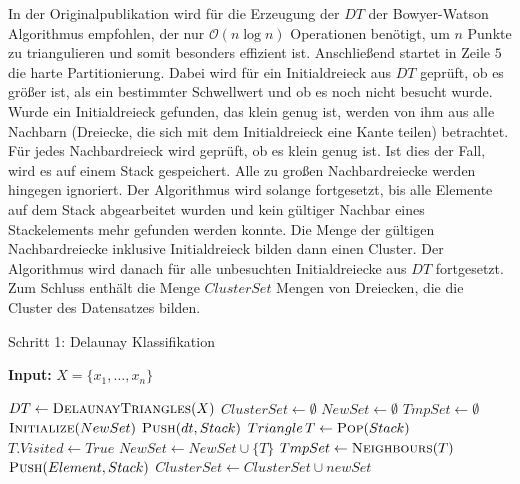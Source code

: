 \documentclass[11pt,ceqn]{book}
\begin{document}
\begin{center}
\begin{minipage}{1\textwidth}
In der Originalpublikation wird für die Erzeugung der $DT$ der Bowyer-Watson Algorithmus empfohlen, der nur $\mathcal{O}(n\log{}n)$ Operationen benötigt, um $n$ Punkte zu triangulieren und somit besonders effizient ist. Anschließend startet in Zeile $5$ die harte Partitionierung. Dabei wird für ein Initialdreieck aus $DT$ geprüft, ob es größer ist, als ein bestimmter Schwellwert und ob es noch nicht besucht wurde. Wurde ein Initialdreieck gefunden, das klein genug ist, werden von ihm aus alle Nachbarn (Dreiecke, die sich mit dem Initialdreieck eine Kante teilen) betrachtet. Für jedes Nachbardreieck wird geprüft, ob es klein genug ist. Ist dies der Fall, wird es auf einem Stack gespeichert. Alle zu großen Nachbardreiecke werden hingegen ignoriert. Der Algorithmus wird solange fortgesetzt, bis alle Elemente auf dem Stack abgearbeitet wurden und kein gültiger Nachbar eines Stackelements mehr gefunden werden konnte. Die Menge der gültigen Nachbardreiecke inklusive Initialdreieck bilden dann einen Cluster. Der Algorithmus wird danach für alle unbesuchten Initialdreiecke aus $DT$ fortgesetzt. Zum Schluss enthält die Menge $ClusterSet$ Mengen von Dreiecken, die die Cluster des Datensatzes bilden.
\end{minipage}
\end{center}





\begin{algorithm}[H]
\caption{ Schritt 1: Delaunay Klassifikation}\label{nsfcdt}
\hspace*{\algorithmicindent} \textbf{Input:} $X=\{x_1,\dots,x_n\}$ 
\begin{algorithmic}[1]
\State $DT \gets \textsc{Delaunay}\textsc{Triangles}(X)$
\State $ClusterSet \gets \emptyset$
\State $NewSet \gets \emptyset$
\State $TmpSet \gets \emptyset$
\State $\textsc{Initialize}(NewSet)$
\State $\textsc{Push}(dt,Stack)$
\State $Triangle\,T \gets \textsc{Pop}(Stack)$
\State $T.Visited \gets True$
\State $NewSet \gets NewSet \cup \{T\}$
\State $TmpSet \gets \textsc{Neighbours}(T)$
\State $\textsc{Push}(Element,Stack)$
\EndIf
\EndFor
\EndIf
\EndWhile
\State $ClusterSet \gets ClusterSet \cup newSet$
\EndIf
\EndFor
\end{algorithmic}
\end{algorithm}
\end{document}
